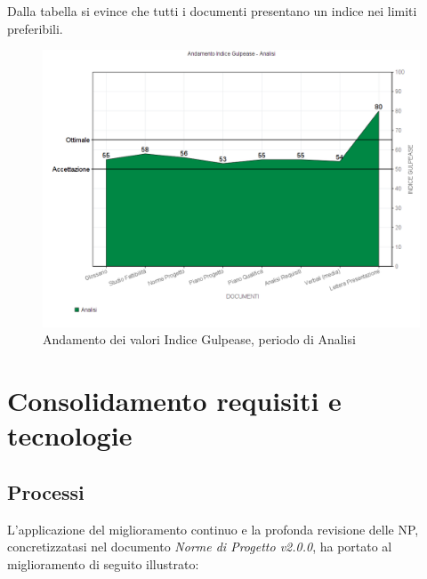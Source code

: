 \documentclass[openany,12pt,a4paper]{report}
\begin{document}
\begin{itemize}
Dalla tabella si evince che tutti i documenti presentano un indice nei limiti preferibili.

\begin{figure}[H]
	\includegraphics[scale=0.5]{verifica-analisi-gulpease}
	\centering
	\caption{Andamento dei valori Indice Gulpease, periodo di Analisi}
\end{figure}

\end{itemize}


\section{Consolidamento requisiti e tecnologie}

\subsection{Processi}

L'applicazione del miglioramento continuo e la profonda revisione delle NP, concretizzatasi nel documento \textit{Norme di Progetto v2.0.0}, ha portato al miglioramento di seguito illustrato:

\newpage
\end{document}
